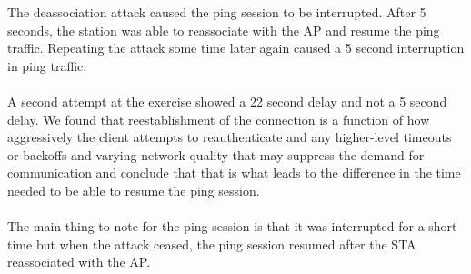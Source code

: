 The deassociation attack caused the ping session to be interrupted. After 5 seconds, the station was able to reassociate with the AP and resume the ping traffic.
Repeating the attack some time later again caused a 5 second interruption in ping traffic. \\ \\A second attempt at the exercise showed a 22 second delay and not a 5 second delay.
%
We found that reestablishment of the connection is a function of how aggressively the client attempts to reauthenticate and any higher-level timeouts or backoffs and varying network quality
that may suppress the demand for communication and conclude that that is what leads to the difference in the time needed to be able to resume the ping session.\\ \\
The main thing to note for the ping session is that it was interrupted for a short time but when the attack ceased, the ping session resumed after the STA reassociated with the AP.
